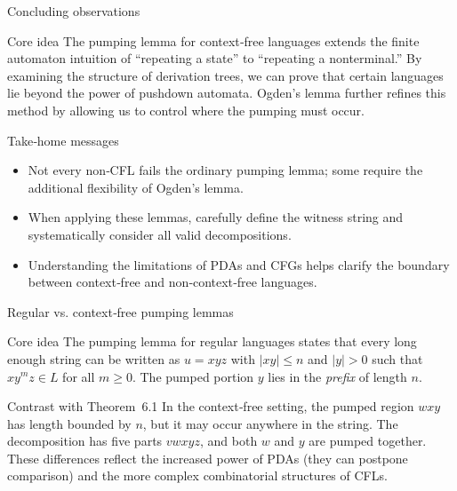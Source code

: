 \begin{frame}[t]{Concluding observations}
  \begin{tblock}{Core idea}
    The pumping lemma for context‑free languages extends the finite
    automaton intuition of “repeating a state” to “repeating a
    nonterminal.”  By examining the structure of derivation trees, we
    can prove that certain languages lie beyond the power of pushdown
    automata.  Ogden’s lemma further refines this method by allowing
    us to control where the pumping must occur.
  \end{tblock}
  \begin{tblock}{Take‑home messages}
    \begin{itemize}
      \item Not every non‑CFL fails the ordinary pumping lemma; some
        require the additional flexibility of Ogden’s lemma.
      \item When applying these lemmas, carefully define the witness
        string and systematically consider all valid decompositions.
      \item Understanding the limitations of PDAs and CFGs helps
        clarify the boundary between context‑free and non‑context‑free
        languages.
    \end{itemize}
  \end{tblock}
  \label{fr:6.1-29}
\end{frame}

\begin{frame}[t]{Regular vs. context‑free pumping lemmas}
  \begin{tblock}{Core idea}
    The pumping lemma for regular languages states that every long
    enough string can be written as $u = x y z$ with $|x y| \le n$ and
    $|y|>0$ such that $x y^m z \in L$ for all $m \ge 0$.  The pumped
    portion $y$ lies in the \textit{prefix} of length $n$.
  \end{tblock}
  \begin{tblock}{Contrast with Theorem 6.1}
    In the context‑free setting, the pumped region $w x y$ has length
    bounded by $n$, but it may occur anywhere in the string.  The
    decomposition has five parts $v w x y z$, and both $w$ and $y$ are
    pumped together.  These differences reflect the increased power of
    PDAs (they can postpone comparison) and the more complex
    combinatorial structures of CFLs.
  \end{tblock}
  \label{fr:6.1-30}
\end{frame}

